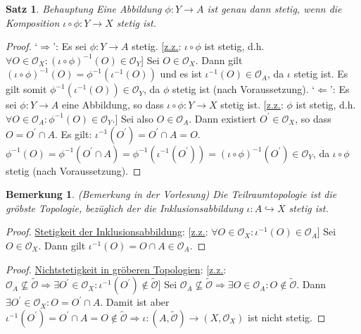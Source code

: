 \documentclass[a4paper,11pt,notitlepage]{report}
\newtheorem{theorem}{Satz}[chapter]
\newtheorem{remark}{Bemerkung}[chapter]
\newcommand{\OO}{{\ensuremath{\mathcal{O}}}}
\begin{document}
\begin{theorem}{Behauptung}
Eine Abbildung $\phi \colon Y \rightarrow A$ ist genau dann stetig, wenn die Komposition $\iota \circ \phi \colon Y \rightarrow X$ stetig ist.
\end{theorem}

\begin{proof}
`$\Rightarrow$': Es sei $\phi \colon Y \rightarrow A$ stetig. [\underline{z.z.}: $\iota \circ \phi$ ist stetig, d.h. $\forall O \in \OO_X \colon (\iota \circ \phi)^{-1}(O) \in \OO_Y$]
\newline
Sei $O \in \OO_X$. Dann gilt $(\iota \circ \phi)^{-1}(O) = \phi^{-1}\left(\iota^{-1}(O)\right)$ und es ist $\iota^{-1}(O) \in \OO_A$, da $\iota$ stetig ist.
\newline
Es gilt somit $\phi^{-1}\left(\iota^{-1}(O)\right) \in \OO_Y$, da $\phi$ stetig ist (nach Voraussetzung).
\newline
`$\Leftarrow$': Es sei $\phi \colon Y \rightarrow A$ eine Abbildung, so dass $\iota \circ \phi \colon Y \rightarrow X$ stetig ist. [\underline{z.z.}: $\phi$ ist stetig, d.h. $\forall O \in \OO_A \colon \phi^{-1}(O) \in \OO_Y$.]
\newline
Sei also $O \in \OO_A$. Dann existiert $O^\prime \in \OO_X$, so dass $O = O^\prime \cap A$.
Es gilt: $\iota^{-1}(O^\prime) = O^\prime \cap A = O$.
\newline
$\phi^{-1}(O) = \phi^{-1}(O^\prime \cap A) = \phi^{-1}\left(\iota^{-1}(O^\prime)\right) = (\iota \circ \phi)^{-1}(O^\prime) \in \OO_Y$, da $\iota \circ \phi$ stetig (nach Voraussetzung).
\end{proof}

\begin{remark}{(Bemerkung in der Vorlesung)}
Die Teilraumtopologie ist die gröbste Topologie, bezüglich der die Inklusionsabbildung $\iota \colon A \hookrightarrow X$ stetig ist.
\end{remark}

\begin{proof}
\underline{Stetigkeit der Inklusionsabbildung}: [\underline{z.z.}: $\forall O \in \OO_X \colon \iota^{-1}(O) \in \OO_A$]
\newline
Sei $O \in \OO_X$. Dann gilt $\iota^{-1}(O)=O \cap A \in \OO_A$.
\end{proof}

\begin{proof}
\underline{Nichtstetigkeit in gröberen Topologien}: [\underline{z.z.}: $\OO_A \not\subseteq \tilde \OO \Rightarrow \exists O^\prime \in \OO_X \colon \iota^{-1}(O^\prime) \notin \tilde \OO$]
\newline
Sei $\OO_A \not\subseteq \tilde \OO \Rightarrow \exists O \in \OO_A\colon O \notin \tilde\OO$. Dann  $\exists O^\prime \in \OO_X \colon O = O^\prime \cap A$. Damit ist aber $\iota^{-1}(O^\prime)=O^\prime \cap A = O \notin \tilde\OO \Rightarrow \iota\colon (A,\tilde\OO) \rightarrow (X,\OO_X)$ ist nicht stetig.
\end{proof}
\end{document}
